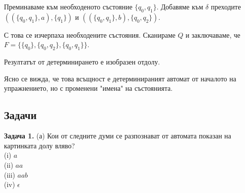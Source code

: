 \documentclass[openany]{book}
\begin{document}
        \vspace{5pt}
    
        Преминаваме към необходеното състояние $\{q_0,q_1\}$. Добавяме към $\delta$
        преходите $((\{q_0,q_1\},a),\{q_1\})$ и $((\{q_0,q_1\},b),\{q_0,q_2\})$.
    
        \vspace{5pt}
    
        С това се изчерпаха необходените състояния. Сканираме $Q$ и заключаваме, че
        $F = \{\{q_0\},\{q_0,q_2\},\{q_0,q_1\}\}$.
    
        \vspace{5pt}
    
        Резултатът от детерминирането е изобразен отдолу.
    
        \begin{center}
      \end{center}
    
      Ясно се вижда, че това всъщност е детерминираният автомат от началото на упражнението,
      но с променени "имена" \hspace{0,01cm} на състоянията.
    
    \vspace{25pt}
    
    \subsection{Задачи}
        \textbf{Задача 1.} (а) Кои от следните думи се разпознават от автомата показан на картинката долу вляво? \\
        (i) $a$ \\
        (ii) $aa$ \\
        (iii) $aab$ \\
        (iv) $\epsilon$
        
\end{document}
